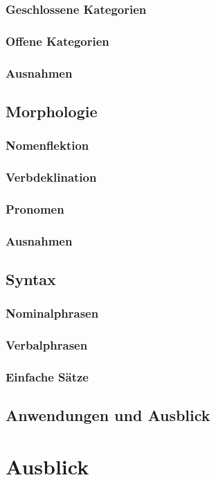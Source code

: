 \documentclass[draft,11pt]{scrartcl}
\begin{document}
\subsubsection{Geschlossene Kategorien}
\subsubsection{Offene Kategorien}
\subsubsection{Ausnahmen} 
\subsection{Morphologie}
\subsubsection{Nomenflektion}
\subsubsection{Verbdeklination}
\subsubsection{Pronomen}
\subsubsection{Ausnahmen}
\subsection{Syntax}
\subsubsection{Nominalphrasen}
\subsubsection{Verbalphrasen}
\subsubsection{Einfache Sätze}
\subsection{Anwendungen und Ausblick}
\section{Ausblick}
\end{document}
